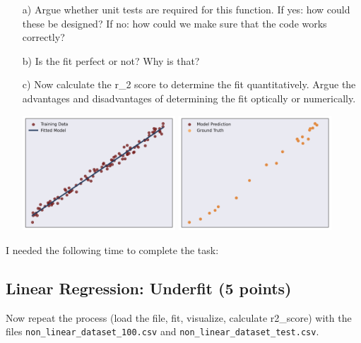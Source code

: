 \begin{enumerate}

\item[a)] Argue whether unit tests are required for this function. If yes: how could these be designed? If no: how could we make sure that the code works correctly?

\item[b)] Is the fit perfect or not? Why is that? 

\item[c)] Now calculate the r\_2 score to determine the fit quantitatively. Argue the advantages and disadvantages of determining the fit optically or numerically.

\includegraphics[width=0.45\textwidth]{source_code/goodfit_linear_model.png}
\includegraphics[width=0.45\textwidth]{source_code/goodfit_linear_testdata.png}

\end{enumerate}

I needed the following time to complete the task:

\subsection{Linear Regression: Underfit (5 points)}

Now repeat the process (load the file, fit, visualize, calculate r2\_score) with the files \texttt{non\_linear\_dataset\_100.csv} and \texttt{non\_linear\_dataset\_test.csv}.

